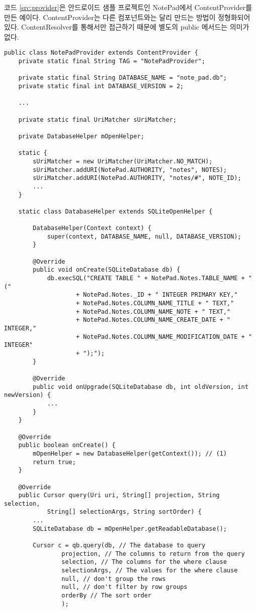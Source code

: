 
코드 \ref{src:provider}은 안드로이드 샘플 프로젝트인 NotePad에서 ContentProvider를 만든 예이다. ContentProvider는 다른 컴포넌트와는 달리 만드는 방법이 정형화되어 있다. ContentResolver를 통해서만 접근하기 때문에 별도의 public 메서드는 의미가 없다.

\begin{lstlisting}[frame=single, caption=ContentProvider 예, label=src:provider] 
public class NotePadProvider extends ContentProvider {
	private static final String TAG = "NotePadProvider";

	private static final String DATABASE_NAME = "note_pad.db";
	private static final int DATABASE_VERSION = 2;

	...

	private static final UriMatcher sUriMatcher;

	private DatabaseHelper mOpenHelper;

	static {
		sUriMatcher = new UriMatcher(UriMatcher.NO_MATCH);
		sUriMatcher.addURI(NotePad.AUTHORITY, "notes", NOTES);
		sUriMatcher.addURI(NotePad.AUTHORITY, "notes/#", NOTE_ID);
		...
	}

	static class DatabaseHelper extends SQLiteOpenHelper {

		DatabaseHelper(Context context) {
			super(context, DATABASE_NAME, null, DATABASE_VERSION);
		}

		@Override
		public void onCreate(SQLiteDatabase db) {
			db.execSQL("CREATE TABLE " + NotePad.Notes.TABLE_NAME + " ("
					+ NotePad.Notes._ID + " INTEGER PRIMARY KEY,"
					+ NotePad.Notes.COLUMN_NAME_TITLE + " TEXT,"
					+ NotePad.Notes.COLUMN_NAME_NOTE + " TEXT,"
					+ NotePad.Notes.COLUMN_NAME_CREATE_DATE + " INTEGER,"
					+ NotePad.Notes.COLUMN_NAME_MODIFICATION_DATE + " INTEGER"
					+ ");");
		}

		@Override
		public void onUpgrade(SQLiteDatabase db, int oldVersion, int newVersion) {
			...
		}
	}

	@Override
	public boolean onCreate() {
		mOpenHelper = new DatabaseHelper(getContext()); // (1)
		return true;
	}

	@Override
	public Cursor query(Uri uri, String[] projection, String selection,
			String[] selectionArgs, String sortOrder) {
		...
		SQLiteDatabase db = mOpenHelper.getReadableDatabase();

		Cursor c = qb.query(db, // The database to query
				projection, // The columns to return from the query
				selection, // The columns for the where clause
				selectionArgs, // The values for the where clause
				null, // don't group the rows
				null, // don't filter by row groups
				orderBy // The sort order
				);


\end{lstlisting}
